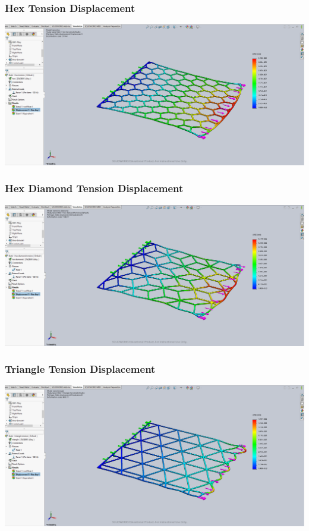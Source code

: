 \documentclass[12pt, letterpaper]{article}
\begin{document}
\begin{singlespace}
\subsubsection{Hex Tension Displacement}
\label{ap:h-te-d}
\includegraphics[width=0.8\linewidth]{./graphs/tension/hex-tension-displacement}

\subsubsection{Hex Diamond Tension Displacement}
\label{ap:hd-te-d}
\includegraphics[width=0.8\linewidth]{./graphs/tension/hex-diamond-tension-displacement}

\subsubsection{Triangle Tension Displacement}
\label{ap:t-te-d}
\includegraphics[width=0.8\linewidth]{./graphs/tension/triangle-tension-displacement}




\end{singlespace}
\end{document}
